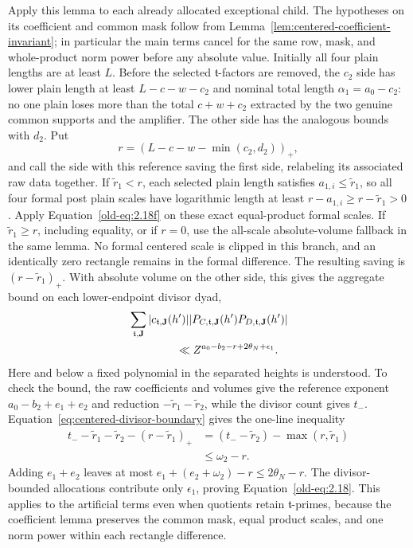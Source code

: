 \documentclass[12pt]{article}
\begin{document}
Apply this lemma to each already allocated exceptional child.  The
hypotheses on its coefficient and common mask follow from
Lemma~\ref{lem:centered-coefficient-invariant}; in particular the
main terms cancel for the same row, mask, and whole-product norm
power before any absolute value.  Initially all four plain lengths
are at least \(L\).  Before the selected \(\mathfrak t\)-factors
are removed, the \(c_2\) side has lower plain length at least
\(L-c-w-c_2\) and nominal total length \(\alpha_1=a_0-c_2\):
no one plain loses more than the total \(c+w+c_2\) extracted by
the two genuine common supports and the amplifier.  The other side
has the analogous bounds with \(d_2\).  Put
\[
 r=(L-c-w-\min(c_2,d_2))_+,
\]
and call the side with this reference saving the first side, relabeling
its associated raw data together.  If \(\widetilde r_1<r\), each
selected plain length satisfies \(a_{1,i}\le\widetilde r_1\), so all
four formal post plain scales have logarithmic length at least
\(r-a_{1,i}\ge r-\widetilde r_1>0\).  Apply
Equation~\eqref{old-eq:2.18f} on these exact equal-product formal scales.
If \(\widetilde r_1\ge r\), including equality, or if \(r=0\), use
the all-scale absolute-volume fallback in the same lemma.  No formal
centered scale is clipped in this branch, and an identically zero
rectangle remains in the formal difference.  The resulting saving is
\((r-\widetilde r_1)_+\).  With absolute volume on the other side,
this gives the aggregate bound on each lower-endpoint divisor dyad,
\begin{equation}
 \begin{split}
 &\sum_{\mathfrak t,\mathbf J}
 |c_{\mathfrak t,\mathbf J}(h')|
 |P_{C,\mathfrak t,\mathbf J}(h')
       P_{D,\mathfrak t,\mathbf J}(h')|\\
 &\hspace{15mm}\ll
 Z^{a_0-b_2-r+2\theta_N+\epsilon_1}.
 \end{split}
 \label{old-eq:2.18}
\end{equation}
Here and below a fixed polynomial in the separated heights is
understood.  To check the bound, the raw coefficients and volumes give
the reference exponent \(a_0-b_2+e_1+e_2\) and reduction
\(-\widetilde r_1-\widetilde r_2\), while the divisor count gives
\(t_-\).  Equation~\eqref{eq:centered-divisor-boundary} gives the
one-line inequality
\begin{equation}
 \begin{split}
 t_- -\widetilde r_1-\widetilde r_2-(r-\widetilde r_1)_+
 &=(t_- -\widetilde r_2)-\max(r,\widetilde r_1)\\
 &\le\omega_2-r.
 \end{split}
 \label{old-eq:2.18h}
\end{equation}
Adding \(e_1+e_2\) leaves at most
\(e_1+(e_2+\omega_2)-r\le2\theta_N-r\).
The divisor-bounded allocations contribute only \(\epsilon_1\),
proving Equation~\eqref{old-eq:2.18}.
This applies to the artificial terms even when quotients retain
\(\mathfrak t\)-primes, because the coefficient lemma preserves the
common mask, equal product scales, and one norm power within each
rectangle difference.
\end{document}

